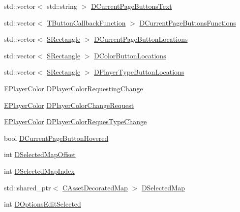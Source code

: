 \begin{DoxyCompactItemize}
\item 
std\+::vector$<$ std\+::string $>$ \hyperlink{classCApplicationData_af04b7f5f8ba4e5c99c0a3530055fc15d}{D\+Current\+Page\+Buttons\+Text}
\item 
std\+::vector$<$ \hyperlink{main_8cpp_af91bc223ea3fea871af009bfef33c595}{T\+Button\+Callback\+Function} $>$ \hyperlink{classCApplicationData_ad3079e5563a19d21c1e4ceff2a188382}{D\+Current\+Page\+Buttons\+Functions}
\item 
std\+::vector$<$ \hyperlink{structSRectangle}{S\+Rectangle} $>$ \hyperlink{classCApplicationData_a3615df8e23cea3ce17f11cf61340a7b4}{D\+Current\+Page\+Button\+Locations}
\item 
std\+::vector$<$ \hyperlink{structSRectangle}{S\+Rectangle} $>$ \hyperlink{classCApplicationData_ac983034ed6e3eec382e22f1d2af25106}{D\+Color\+Button\+Locations}
\item 
std\+::vector$<$ \hyperlink{structSRectangle}{S\+Rectangle} $>$ \hyperlink{classCApplicationData_a49d2ad6ab469e18577716ac993b475cb}{D\+Player\+Type\+Button\+Locations}
\item 
\hyperlink{GameDataTypes_8h_aafb0ca75933357ff28a6d7efbdd7602f}{E\+Player\+Color} \hyperlink{classCApplicationData_a5231cd0c9d8bb76ab32c7f2a114e41f1}{D\+Player\+Color\+Requesting\+Change}
\item 
\hyperlink{GameDataTypes_8h_aafb0ca75933357ff28a6d7efbdd7602f}{E\+Player\+Color} \hyperlink{classCApplicationData_ae72fd0906b911705aafb9df8cf610f97}{D\+Player\+Color\+Change\+Request}
\item 
\hyperlink{GameDataTypes_8h_aafb0ca75933357ff28a6d7efbdd7602f}{E\+Player\+Color} \hyperlink{classCApplicationData_a6724e09974db5fe5f147d9898f468dbc}{D\+Player\+Color\+Reques\+Type\+Change}
\item 
bool \hyperlink{classCApplicationData_a96b3a9b5c9965540007dff3fa85587fa}{D\+Current\+Page\+Button\+Hovered}
\item 
int \hyperlink{classCApplicationData_a443edd0c2c7964fc51a82bf2a016725b}{D\+Selected\+Map\+Offset}
\item 
int \hyperlink{classCApplicationData_a279cfd90004e3f1b90b119358ff25586}{D\+Selected\+Map\+Index}
\item 
std\+::shared\+\_\+ptr$<$ \hyperlink{classCAssetDecoratedMap}{C\+Asset\+Decorated\+Map} $>$ \hyperlink{classCApplicationData_abf74a18394e479b7090a8f9a55608867}{D\+Selected\+Map}
\item 
int \hyperlink{classCApplicationData_aee4aa5eb5b89b86eb2648d0f9c7358f9}{D\+Options\+Edit\+Selected}

\end{DoxyCompactItemize}
